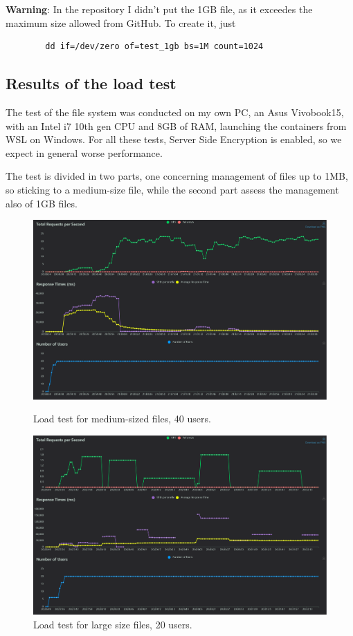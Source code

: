 \documentclass{article}
\begin{document}
	\textbf{Warning}: In the repository I didn't put the 1GB file, as it exceedes the maximum size allowed from GitHub. To create it, just
	\begin{verbatim}
		dd if=/dev/zero of=test_1gb bs=1M count=1024
	\end{verbatim}
	
	\subsection{Results of the load test}
	The test of the file system was conducted on my own PC, an Asus Vivobook15, with an Intel i7 10th gen CPU and 8GB of RAM, launching the containers from WSL on Windows. For all these tests, Server Side Encryption is enabled, so we expect in general worse performance.
	
	The test is divided in two parts, one concerning management of files up to 1MB, so sticking to a medium-size file, while the second part assess the management also of 1GB files.
	
	\begin{figure}[h]
		\centering
		\includegraphics[width=0.7\linewidth]{total_requests_per_second_40user1mb}
		\caption{Load test for medium-sized files, 40 users.}
		\label{fig:totalrequestspersecond40user1mb}
		\includegraphics[width=0.7\linewidth]{response_times_(ms)_20users_1gb}
		\caption{Load test for large size files, 20 users.}
		\label{fig:responsetimesms20users1gb}
	\end{figure}
	
\end{document}

